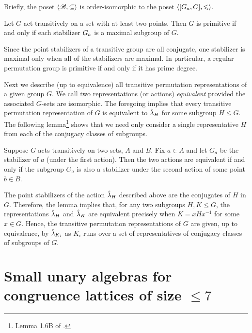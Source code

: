 Briefly, the poset $\langle\mathscr{B}, \subseteq\rangle$ is order-isomorphic to the 
poset $\langle[G_{a},G], \leqslant\rangle$. 

\begin{corollary}
  Let $G$ act transitively on a set with at least two
  points. 
  Then $G$ is primitive if and only if each stabilizer $G_{a}$ is a
  maximal subgroup of $G$.
\end{corollary}

Since the point stabilizers of a transitive group are all conjugate, 
one stabilizer is maximal only when all of the stabilizers are maximal. 
In particular, a regular permutation group is primitive if and only if it has
prime degree. 

Next we describe (up to equivalence) all transitive permutation
representations of a given group $G$.  
We call two representations (or actions) 
%
\emph{equivalent}
provided the associated $G$-sets are isomorphic. 
The foregoing implies that every transitive permutation representation of $G$ is
equivalent to $\hat{\lambda}_H$ for some subgroup $H \leq G$.  The following
lemma\footnote{Lemma 1.6B of \cite{Dixon:1996}.} 
shows that we need only consider a single representative $H$ from each of the
conjugacy classes of subgroups.  

\begin{lemma}
  Suppose $G$ acts transitively on two sets,
  $A$ and $B$.  Fix $a\in A$ and let $G_a$ be the stabilizer of $a$ (under the first
  action).  Then the two actions are equivalent
  if and only if the subgroup $G_a$ is also a stabilizer under the second action
  of some point $b\in B$. 
\end{lemma}

The point stabilizers of the action $\hat{\lambda}_H$ described above are the
conjugates of $H$ in $G$.  Therefore, the lemma implies that, for any two
subgroups $H, K \leq G$, the representations $\hat{\lambda}_H$ and $\hat{\lambda}_K$ are
equivalent precisely when $K = x Hx^{-1}$ for some $x\in G$. 
Hence, the transitive permutation representations of $G$ are given, up to
equivalence, by $\hat{\lambda}_{K_i}$ as $K_i$ runs over a set of representatives of
conjugacy classes of subgroups of $G$.   



\section{Small unary algebras for congruence lattices of size $\le 7$}

